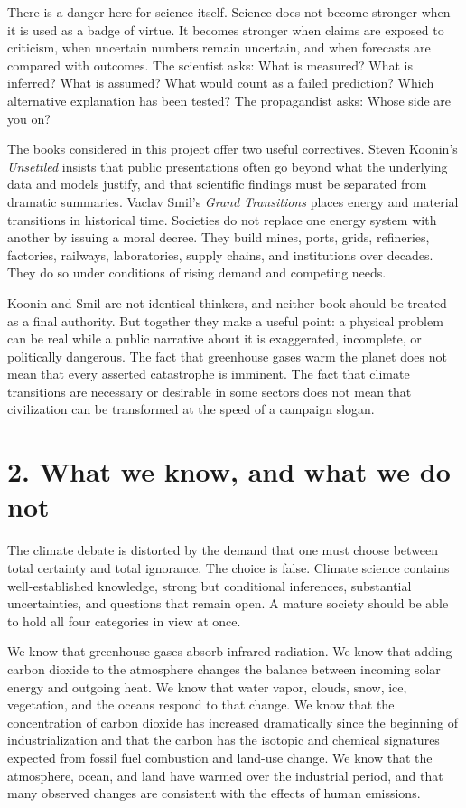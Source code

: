 ﻿\documentclass[12pt,a4paper]{book}
\begin{document}
There is a danger here for science itself. Science does not become stronger when it is used as a badge of virtue. It becomes stronger when claims are exposed to criticism, when uncertain numbers remain uncertain, and when forecasts are compared with outcomes. The scientist asks: What is measured? What is inferred? What is assumed? What would count as a failed prediction? Which alternative explanation has been tested? The propagandist asks: Whose side are you on?

The books considered in this project offer two useful correctives. Steven Koonin's \emph{Unsettled} insists that public presentations often go beyond what the underlying data and models justify, and that scientific findings must be separated from dramatic summaries. Vaclav Smil's \emph{Grand Transitions} places energy and material transitions in historical time. Societies do not replace one energy system with another by issuing a moral decree. They build mines, ports, grids, refineries, factories, railways, laboratories, supply chains, and institutions over decades. They do so under conditions of rising demand and competing needs. \cite{Koonin2021,Smil2021}

Koonin and Smil are not identical thinkers, and neither book should be treated as a final authority. But together they make a useful point: a physical problem can be real while a public narrative about it is exaggerated, incomplete, or politically dangerous. The fact that greenhouse gases warm the planet does not mean that every asserted catastrophe is imminent. The fact that climate transitions are necessary or desirable in some sectors does not mean that civilization can be transformed at the speed of a campaign slogan.

\section{2. What we know, and what we do not}
The climate debate is distorted by the demand that one must choose between total certainty and total ignorance. The choice is false. Climate science contains well-established knowledge, strong but conditional inferences, substantial uncertainties, and questions that remain open. A mature society should be able to hold all four categories in view at once.

We know that greenhouse gases absorb infrared radiation. We know that adding carbon dioxide to the atmosphere changes the balance between incoming solar energy and outgoing heat. We know that water vapor, clouds, snow, ice, vegetation, and the oceans respond to that change. We know that the concentration of carbon dioxide has increased dramatically since the beginning of industrialization and that the carbon has the isotopic and chemical signatures expected from fossil fuel combustion and land-use change. We know that the atmosphere, ocean, and land have warmed over the industrial period, and that many observed changes are consistent with the effects of human emissions.
\end{document}
